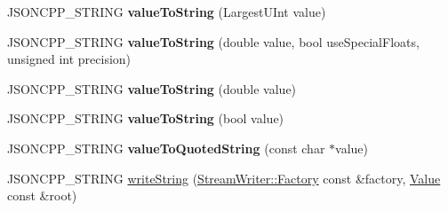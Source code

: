 \begin{DoxyCompactItemize}
\item 
J\+S\+O\+N\+C\+P\+P\+\_\+\+S\+T\+R\+I\+NG {\bfseries value\+To\+String} (Largest\+U\+Int value)\hypertarget{namespace_json_a9a0432e5ac3dd69b6c7f29db7776ef21}{}\label{namespace_json_a9a0432e5ac3dd69b6c7f29db7776ef21}

\item 
J\+S\+O\+N\+C\+P\+P\+\_\+\+S\+T\+R\+I\+NG {\bfseries value\+To\+String} (double value, bool use\+Special\+Floats, unsigned int precision)\hypertarget{namespace_json_a41f0a9fca69a534a8646ce0123683a8b}{}\label{namespace_json_a41f0a9fca69a534a8646ce0123683a8b}

\item 
J\+S\+O\+N\+C\+P\+P\+\_\+\+S\+T\+R\+I\+NG {\bfseries value\+To\+String} (double value)\hypertarget{namespace_json_aa99b8b8dc736259e5a229a4e61d7ea92}{}\label{namespace_json_aa99b8b8dc736259e5a229a4e61d7ea92}

\item 
J\+S\+O\+N\+C\+P\+P\+\_\+\+S\+T\+R\+I\+NG {\bfseries value\+To\+String} (bool value)\hypertarget{namespace_json_aed05b7acd30f7442fe36b24c7abd10b9}{}\label{namespace_json_aed05b7acd30f7442fe36b24c7abd10b9}

\item 
J\+S\+O\+N\+C\+P\+P\+\_\+\+S\+T\+R\+I\+NG {\bfseries value\+To\+Quoted\+String} (const char $\ast$value)\hypertarget{namespace_json_a19a9262b788aa2754d3931e7cd01f2fc}{}\label{namespace_json_a19a9262b788aa2754d3931e7cd01f2fc}

\item 
J\+S\+O\+N\+C\+P\+P\+\_\+\+S\+T\+R\+I\+NG \hyperlink{namespace_json_aabe79c4d15b195a343b06825693b0a16}{write\+String} (\hyperlink{class_json_1_1_stream_writer_1_1_factory}{Stream\+Writer\+::\+Factory} const \&factory, \hyperlink{class_json_1_1_value}{Value} const \&root)\hypertarget{namespace_json_aabe79c4d15b195a343b06825693b0a16}{}\label{namespace_json_aabe79c4d15b195a343b06825693b0a16}


\end{DoxyCompactItemize}
